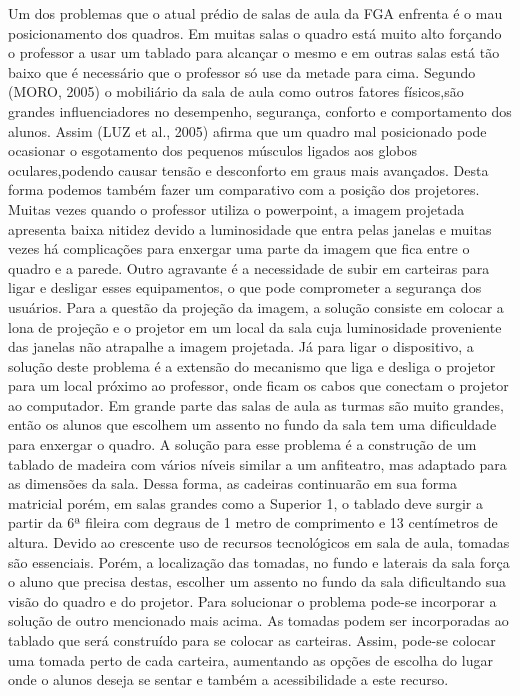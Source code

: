 Um dos problemas que o atual prédio de salas de aula da FGA enfrenta é o mau posicionamento dos quadros. Em muitas salas o quadro está muito alto forçando o professor a usar um tablado para alcançar o mesmo e em outras salas está tão baixo que é necessário que o professor só use da metade para cima. Segundo (MORO, 2005) o mobiliário da sala de aula como outros fatores físicos,são grandes influenciadores no desempenho, segurança, conforto e comportamento dos alunos. Assim (LUZ et al., 2005) afirma que um quadro mal posicionado pode ocasionar o esgotamento dos pequenos músculos ligados aos globos oculares,podendo causar tensão e desconforto em graus mais avançados.
Desta forma podemos também fazer um comparativo com a posição dos projetores. Muitas vezes quando o professor utiliza o powerpoint, a imagem projetada apresenta baixa nitidez devido a luminosidade que entra pelas janelas e muitas vezes há complicações para enxergar uma parte da imagem que fica entre o quadro e a parede. Outro agravante é a necessidade de subir em carteiras para ligar e desligar esses equipamentos, o que pode comprometer a segurança dos usuários.
Para a questão da projeção da imagem, a solução consiste em colocar a lona de projeção e o projetor em um local da sala cuja luminosidade proveniente das janelas não atrapalhe a imagem projetada. Já para ligar o dispositivo, a solução deste problema é a extensão do mecanismo que liga e desliga o projetor para um local próximo ao professor, onde ficam os cabos que conectam o projetor ao computador.
Em grande parte das salas de aula as turmas são muito grandes, então os alunos que escolhem um assento no fundo da sala tem uma dificuldade para enxergar o quadro. A solução para esse problema é a construção de um tablado de madeira com vários níveis similar a um anfiteatro, mas adaptado para as dimensões da sala. Dessa forma, as cadeiras continuarão em sua forma matricial porém, em salas grandes como a Superior 1, o tablado deve surgir a partir da 6ª fileira com degraus de 1 metro de comprimento e 13 centímetros de altura.
Devido ao crescente uso de recursos tecnológicos em sala de aula, tomadas são essenciais. Porém, a localização das tomadas, no fundo e laterais da sala força o aluno que precisa destas, escolher um assento no fundo da sala dificultando sua visão do quadro e do projetor. Para solucionar o problema pode-se incorporar a solução de outro mencionado mais acima. As tomadas podem ser incorporadas ao tablado que será construído para se colocar as carteiras. Assim, pode-se colocar uma tomada perto de cada carteira, aumentando as opções de escolha do lugar onde o alunos deseja se sentar e também a acessibilidade a este recurso.
